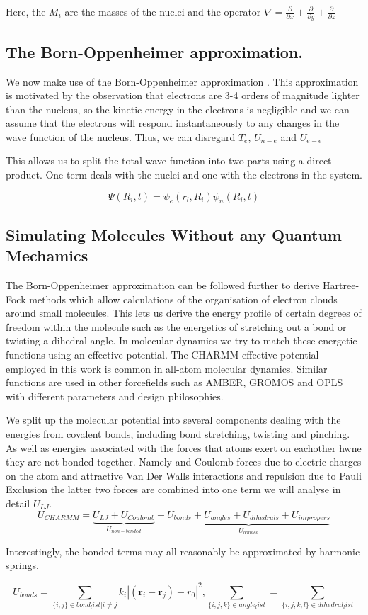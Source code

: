 Here, the $M_i$ are the masses of the nuclei and the operator $\nabla = \frac{\partial}{\partial x} + \frac{\partial }{\partial y} + \frac{\partial}{\partial z} $


\subsection{The Born-Oppenheimer approximation.}
We now make use of the Born-Oppenheimer approximation \cite{Born1927}. This approximation is motivated by the observation that electrons are 3-4 orders of magnitude lighter than the nucleus, so the kinetic energy in the electrons is negligible and we can assume that the electrons will respond instantaneously to any changes in the wave function of the nucleus. Thus, we can disregard $T_e$, $U_{n-e}$ and $U_{e-e}$

This allows us to split the total wave function into two parts using a direct product. One term deals with the nuclei and one with the electrons in the system. 

\begin {equation}
\Psi(R_i,t) = \psi_e (r_l,R_i) \psi_n(R_i,t)
\end {equation}

\subsection{Simulating Molecules Without any Quantum Mechamics}
The Born-Oppenheimer approximation can be followed further to derive Hartree-Fock methods which allow calculations of the organisation of electron clouds around small molecules. This lets us derive the energy profile of certain degrees of freedom within the molecule such as the energetics of stretching out a bond or twisting a dihedral angle. In molecular dynamics we try to match these energetic functions using an effective potential. 
The CHARMM effective potential employed in this work is common in all-atom molecular dynamics. Similar functions are used in other forcefields such as AMBER, GROMOS and OPLS with different parameters and design philosophies.

We split up the molecular potential into several components dealing with the energies from covalent bonds, including bond stretching, twisting and pinching. As well as energies associated with the forces that atoms exert on eachother hwne they are not bonded together. Namely and Coulomb forces due to electric charges on the atom and attractive Van Der Walls interactions and repulsion due to Pauli Exclusion the latter two forces are combined into one term we will analyse in detail $U_{LJ}$.
\begin{equation}
	U_{CHARMM} = \underbrace{U_{LJ} + U_{Coulomb}}_{U_{non-bonded}} + \underbrace{U_{bonds} + U_{angles} + U_{dihedrals} + U_{impropers}}_{U_{bonded}}
\end{equation}

Interestingly, the bonded terms may all reasonably be approximated by harmonic springs. 

\begin{equation}
	U_{bonds} = \sum_{\{i,j\} \in bond_list | i\neq j } k_{i} |(\textbf{r}_i - \textbf{r}_j) - r_0 |^2 , \sum_{\{i,j,k\} \in angle_list} = \sum_{\{i,j,k,l\} \in dihedral_list } 

\end{equation}

